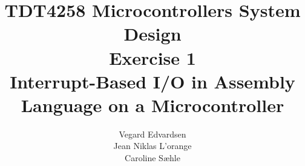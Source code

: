 \documentclass[a4paper,10pt]{article}
\title{TDT4258 Microcontrollers System Design\\Exercise 1\\[20pt]Interrupt-Based I/O in Assembly Language on a Microcontroller}
\author{Vegard Edvardsen\\Jean Niklas L'orange\\Caroline Sæhle}
\begin{document}
\maketitle

\begin{abstract}

\end{abstract}







\end{document}
